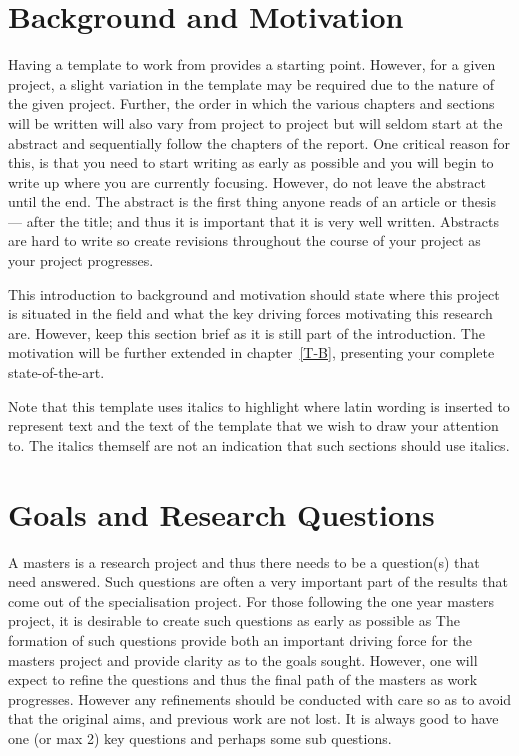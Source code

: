 \documentclass[a4paper]{book}
\begin{document}
\section{Background and Motivation}\label{cit}
\label{sec:BackgroundAndMotivation}

Having a template to work from provides a starting point. However, for a given project, a slight variation in the template may be required due to the nature of the given project. Further, the order in which the various chapters and sections will be written will also vary from project to project but will seldom start at the abstract and sequentially follow the chapters of the report. One critical reason for this, is that you need to start writing as early as possible and you will begin to write up where you are currently focusing. However, do not leave the abstract until the end. The abstract is the first thing anyone reads of an article or thesis --- after the title; and thus it is important that it is very well written. Abstracts are hard to write so create revisions throughout the course of your project as your project progresses.  

This introduction to background and motivation should state where this project is situated in the field and what the key driving forces motivating this research are. However, keep this section brief as it is still part of the introduction. The motivation will be further extended in chapter~\ref{T-B}, presenting your complete state-of-the-art. 

Note that this template uses italics to highlight where latin wording is inserted to represent text and the text of the template that we wish to draw your attention to. The italics themself are not an indication that such sections should use italics.  

\section{Goals and Research Questions}
\label{sec:Goals and Research Questions}

A masters is a research project and thus there needs to be a question(s) that need answered. Such questions are often a very important part of the results that come out of the specialisation project. For those following the one year masters project, it is desirable to create such questions as early as possible as   The formation of such questions provide both an important driving force for the masters project and provide clarity as to the goals sought. However, one will expect to refine the questions and thus the final path of the masters as work progresses. However any refinements should be conducted with care so as to avoid that the original aims, and previous work are not lost.  
It is always good to have one (or max 2) key questions and perhaps some sub questions. 
\end{document}
